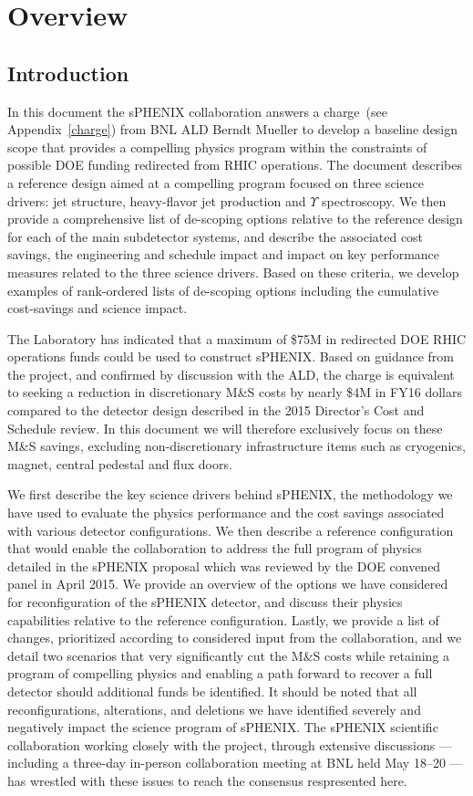 \chapter{Overview}
\label{configurations}
\setcounter{page}{1}

\section{Introduction}
In this document the sPHENIX collaboration answers a charge~(see
Appendix~\ref{charge}) from BNL ALD Berndt Mueller to develop a
baseline design scope that provides a compelling physics program
within the constraints of possible DOE funding redirected from RHIC
operations. The document describes a reference design aimed at a
compelling program focused on three science drivers: jet structure,
heavy-flavor jet production and $\Upsilon$ spectroscopy. We then
provide a comprehensive list of de-scoping options relative to the
reference design for each of the main subdetector systems, and
describe the associated cost savings, the engineering and schedule
impact and impact on key performance measures related to the three
science drivers. Based on these criteria, we develop examples of
rank-ordered lists of de-scoping options including the cumulative
cost-savings and science impact.

The Laboratory has indicated that a maximum of \$75M in redirected DOE
RHIC operations funds could be used to construct sPHENIX.  Based on
guidance from the project, and confirmed by discussion with the ALD,
the charge is equivalent to seeking a reduction in discretionary M\&S
costs by nearly \$4M in FY16 dollars compared to the detector design
described in the 2015 Director's Cost and Schedule review.  In this
document we will therefore exclusively focus on these M\&S savings,
excluding non-discretionary infrastructure items such as cryogenics,
magnet, central pedestal and flux doors.

We first describe the key science drivers behind sPHENIX, the
methodology we have used to evaluate the physics performance and the
cost savings associated with various detector configurations.  We then
describe a reference configuration that would enable the collaboration
to address the full program of physics detailed in the sPHENIX
proposal which was reviewed by the DOE convened panel in April 2015.
We provide an overview of the options we have considered for
reconfiguration of the sPHENIX detector, and discuss their physics
capabilities relative to the reference configuration.  Lastly, we
provide a list of changes, prioritized according to considered input
from the collaboration, and we detail two scenarios that very
significantly cut the M\&S costs while retaining a program of
compelling physics and enabling a path forward to recover a full
detector should additional funds be identified.  It should be noted
that all reconfigurations, alterations, and deletions we have
identified severely and negatively impact the science program of
sPHENIX.  The sPHENIX scientific collaboration working closely with
the project, through extensive discussions --- including a three-day
in-person collaboration meeting at BNL held May 18--20 --- has
wrestled with these issues to reach the consensus respresented here.
